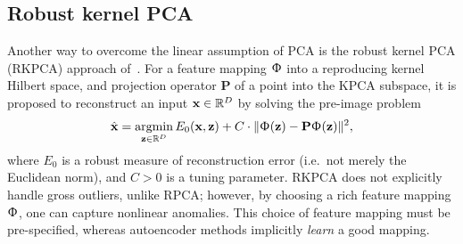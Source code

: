 %
\subsection{Robust kernel PCA}

Another way to overcome the linear assumption of PCA is the robust kernel PCA (RKPCA) approach of~\cite{Nguyen:2009}.
For a feature mapping $\Upphi$ into a reproducing kernel Hilbert space, and projection operator $\mathbf{P}$ of a point into the KPCA subspace, it is proposed to reconstruct an input $\mathbf{x} \in \mathbb{R}^D$ by solving the pre-image problem
\begin{equation}
	\label{eqn:rkpca}
	\hat{\mathbf{x}} = \underset{\mathbf{z} \in \mathbb{R}^D}{\mathrm{argmin}} \, E_0( \mathbf{x}, \mathbf{z} ) + C \cdot \| \Upphi( \mathbf{z} ) - \mathbf{P} \Upphi( \mathbf{z} ) \|^2,
\end{equation}
where $E_0$ is a robust measure of reconstruction error (i.e.\ not merely the Euclidean norm),
and $C > 0$ is a tuning parameter.
RKPCA does not explicitly handle gross outliers, unlike RPCA;
however, by choosing a rich feature mapping $\Upphi$, %
one can capture nonlinear anomalies.
This choice of feature mapping must be pre-specified, whereas autoencoder methods implicitly \emph{learn} a good mapping.
